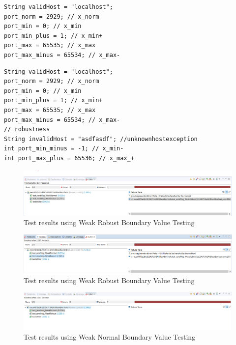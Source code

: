 \documentclass[fontsize=12pt,paper=letter,twoside]{scrartcl}
\begin{document}
\begin{itemize}
\begin{lstlisting}[caption={Weak Normal Testing Variables},label={list:weak_normal}]
String validHost = "localhost";
port_norm = 2929; // x_norm
port_min = 0; // x_min
port_min_plus = 1; // x_min+
port_max = 65535; // x_max
port_max_minus = 65534; // x_max-
\end{lstlisting}

\begin{lstlisting}[caption={Weak Robust Testing Variables},label={list:weak_robust}]
String validHost = "localhost";
port_norm = 2929; // x_norm
port_min = 0; // x_min
port_min_plus = 1; // x_min+
port_max = 65535; // x_max
port_max_minus = 65534; // x_max-
// robustness
String invalidHost = "asdfasdf"; //unknownhostexception
int port_min_minus = -1; // x_min-
int port_max_plus = 65536; // x_max_+
\end{lstlisting}
\newpage
\begin{figure}[!htb]
\begin{center}
\includegraphics[width=.99\textwidth]{images/bbt/bvt-fail-1.png}
\end{center}
\caption{Test results using Weak Robust Boundary Value Testing}
\label{fig:bbt_bvt1}
\end{figure}

\begin{figure}[!htb]
\begin{center}
\includegraphics[width=.99\textwidth]{images/bbt/bvt-fail-2.png}
\end{center}
\caption{Test results using Weak Robust Boundary Value Testing}
\label{fig:bbt_bvt2}
\end{figure}

\begin{figure}[!htb]
\begin{center}
\includegraphics[width=.99\textwidth]{images/bbt/bvt-pass.png}
\end{center}
\caption{Test results using Weak Normal Boundary Value Testing}
\label{fig:bbt_bvt3}
\end{figure}


\end{itemize}
\end{document}
